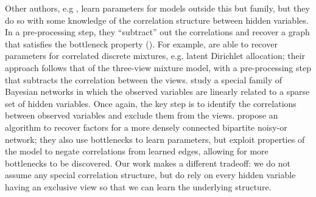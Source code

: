 
Other authors, e.g \citet{anandkumar12lda, anandkumar2013linear,
  halpern13noisyor}, learn parameters for models outside this
  but family, but they do so with some knowledge of the correlation structure
  between hidden variables. 
In a pre-processing step, they ``subtract'' out the correlations and
  recover a graph that satisfies the bottleneck property
  ().
%
For example,
\citet{anandkumar12lda} are able to recover parameters for correlated
  discrete mixtures, e.g. latent Dirichlet allocation; their approach
  follows that of the three-view mixture model, with a pre-processing step
  that subtracts the correlation between the views.
\citet{anandkumar2013linear} study a special family of Bayesian networks
  in which the observed variables are linearly related to a sparse set of
  hidden variables. Once again, the key step is to identify the
  correlations between observed variables and exclude them from the views.
\citet{halpern13noisyor} propose an algorithm to recover factors for
  a more densely connected bipartite noisy-or network; they also use
  bottlenecks to learn parameters, but exploit properties of the model
  to negate correlations from learned edges, allowing for more
  bottlenecks to be discovered. 
Our work makes a different tradeoff: we do not assume any special correlation structure,
but do rely on every hidden variable having an exclusive view so that we can
learn the underlying structure.


